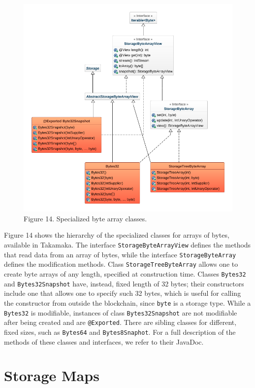 \documentclass[a4paper,]{book}
\begin{document}
{\begin{figure}
\centering
\includegraphics{pics/bytes.png}
\caption{Figure 14. Specialized byte array classes.}
\end{figure}

Figure 14 shows the hierarchy of the specialized classes for arrays of
bytes, available in Takamaka. The interface
\texttt{StorageByteArrayView} defines the methods that read data from an
array of bytes, while the interface \texttt{StorageByteArray} defines
the modification methods. Class \texttt{StorageTreeByteArray} allows one
to create byte arrays of any length, specified at construction time.
Classes \texttt{Bytes32} and \texttt{Bytes32Snapshot} have, instead,
fixed length of 32 bytes; their constructors include one that allows one
to specify such 32 bytes, which is useful for calling the constructor
from outside the blockchain, since \texttt{byte} is a storage type.
While a \texttt{Bytes32} is modifiable, instances of class
\texttt{Bytes32Snapshot} are not modifiable after being created and are
\texttt{@Exported}. There are sibling classes for different, fixed
sizes, such as \texttt{Bytes64} and \texttt{Bytes8Snaphot}. For a full
description of the methods of these classes and interfaces, we refer to
their JavaDoc.

\hypertarget{storage-maps}{%
\section{Storage Maps }\label{storage-maps}}

}
\end{document}

